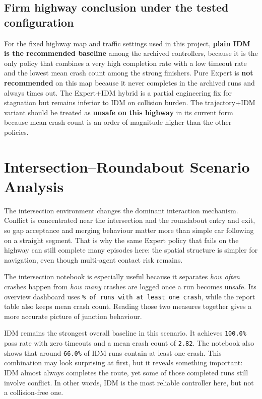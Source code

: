 \documentclass[12pt,a4paper]{report}
\begin{document}
\subsection{Firm highway conclusion under the tested configuration}
For the fixed highway map and traffic settings used in this project, \textbf{plain IDM is the recommended baseline} among the archived controllers, because it is the only policy that combines a very high completion rate with a low timeout rate and the lowest mean crash count among the strong finishers. Pure Expert is \textbf{not recommended} on this map because it never completes in the archived runs and always times out. The Expert+IDM hybrid is a partial engineering fix for stagnation but remains inferior to IDM on collision burden. The trajectory+IDM variant should be treated as \textbf{unsafe on this highway} in its current form because mean crash count is an order of magnitude higher than the other policies.

\section{Intersection--Roundabout Scenario Analysis}
The intersection environment changes the dominant interaction mechanism. Conflict is concentrated near the intersection and the roundabout entry and exit, so gap acceptance and merging behaviour matter more than simple car following on a straight segment. That is why the same Expert policy that fails on the highway can still complete many episodes here: the spatial structure is simpler for navigation, even though multi-agent contact risk remains.

The intersection notebook is especially useful because it separates \emph{how often} crashes happen from \emph{how many} crashes are logged once a run becomes unsafe. Its overview dashboard uses \texttt{\% of runs with at least one crash}, while the report table also keeps mean crash count. Reading those two measures together gives a more accurate picture of junction behaviour.

IDM remains the strongest overall baseline in this scenario. It achieves \texttt{100.0\%} pass rate with zero timeouts and a mean crash count of \texttt{2.82}. The notebook also shows that around \texttt{66.0\%} of IDM runs contain at least one crash. This combination may look surprising at first, but it reveals something important: IDM almost always completes the route, yet some of those completed runs still involve conflict. In other words, IDM is the most reliable controller here, but not a collision-free one.
\end{document}
